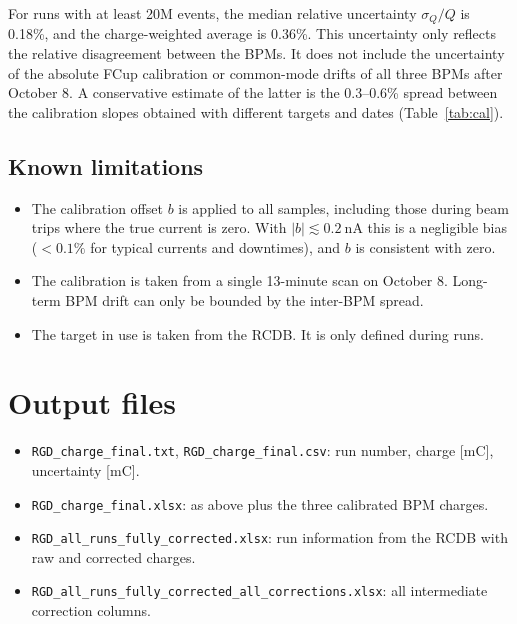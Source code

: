 \documentclass[11pt]{article}
\newcommand{\code}[1]{\texttt{#1}}
\begin{document}
For runs with at least 20M events, the median relative uncertainty $\sigma_Q/Q$ is 0.18\%, and the
charge-weighted average is 0.36\%. This uncertainty only reflects the relative disagreement
between the BPMs. It does not include the uncertainty of the absolute FCup calibration
or common-mode drifts of all three BPMs after October 8. A conservative estimate of the latter
is the 0.3--0.6\% spread between the calibration slopes obtained with different targets and dates
(Table~\ref{tab:cal}).

\subsection{Known limitations}
\begin{itemize}
  \item The calibration offset $b$ is applied to all samples, including those during beam trips
        where the true current is zero. With $|b|\lesssim\SI{0.2}{\nano\ampere}$ this is a
        negligible bias ($<0.1\%$ for typical currents and downtimes), and $b$ is consistent with zero.
  \item The calibration is taken from a single 13-minute scan on October 8. Long-term BPM drift
        can only be bounded by the inter-BPM spread.
  \item The target in use is taken from the RCDB. It is only defined during runs.
\end{itemize}

\section{Output files}
\begin{itemize}
  \item \code{RGD\_charge\_final.txt}, \code{RGD\_charge\_final.csv}: run number, charge [mC], uncertainty [mC].
  \item \code{RGD\_charge\_final.xlsx}: as above plus the three calibrated BPM charges.
  \item \code{RGD\_all\_runs\_fully\_corrected.xlsx}: run information from the RCDB with raw and corrected charges.
  \item \code{RGD\_all\_runs\_fully\_corrected\_all\_corrections.xlsx}: all intermediate correction columns.
\end{itemize}
\end{document}
